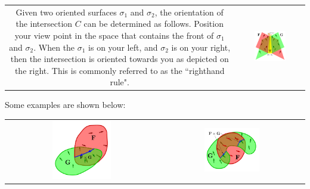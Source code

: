 \begin{tabular}{cc}
\parbox{0.5\textwidth}{
Given two oriented surfaces \(\sigma_1\) and \(\sigma_2\), the orientation of the intersection \(C\) can be determined as follows. Position your view point in the space that contains the front of \(\sigma_1\) and \(\sigma_2\). When the \(\sigma_1\) is on your left, and \(\sigma_2\) is on your right, then the intersection is oriented towards you as depicted on the right. This is commonly referred to as the ``righthand rule".
} & \parbox{0.5\textwidth}{
\includegraphics[width = 0.5\textwidth]{Intersections/Surface-surface_intersections/right_hand_rule}
}
\end{tabular}

Some examples are shown below:

\begin{center}
\begin{tabular}{cc}
\includegraphics[width = 0.4\textwidth]{Intersections/Surface-surface_intersections/surface_surface_intersections_example}
& 
\includegraphics[width = 0.4\textwidth]{Intersections/Surface-surface_intersections/surface_surface_intersections_example_2}
\end{tabular}
\end{center}

